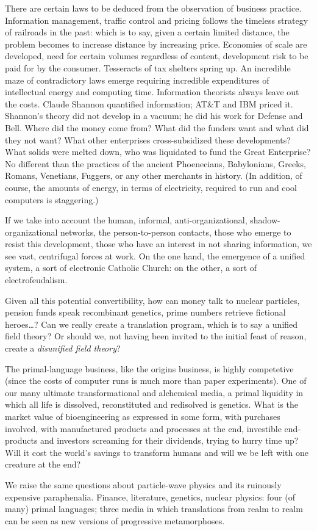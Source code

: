 There are certain laws to be deduced from the observation of business practice. Information management, traffic control and pricing follows the timeless strategy of railroads in the past: which is to say, given a certain limited distance, the problem becomes to increase distance by increasing price. Economies of scale are developed, need for certain volumes regardless of content, development risk to be paid for by the consumer. Tesseracts of tax shelters spring up. An incredible maze of contradictory laws emerge requiring incredible expenditures of intellectual energy and computing time. Information theorists always leave out the costs. Claude Shannon quantified information; AT\&T and IBM priced it. Shannon's theory did not develop in a vacuum; he did his work for Defense and Bell. Where did the money come from? What did the funders want and what did they not want? What other enterprises cross-subsidized these developments? What solids were melted down, who was liquidated to fund the Great Enterprise? No different than the practices of the ancient Phoenecians, Babylonians, Greeks, Romans, Venetians, Fuggers, or any other merchants in history. (In addition, of course, the amounts of energy, in terms of electricity, required to run and cool computers is staggering.)

If we take into account the human, informal, anti-organizational, shadow-organizational networks, the person-to-person contacts, those who emerge to resist this development, those who have an interest in not sharing information, we see vast, centrifugal forces at work. On the one hand, the emergence of a unified system, a sort of electronic Catholic Church: on the other, a sort of electrofeudalism.

Given all this potential convertibility, how can money talk to nuclear particles, pension funds speak recombinant genetics, prime numbers retrieve fictional heroes\ldots ? Can we really create a translation program, which is to say a unified field theory? Or should we, not having been invited to the initial feast of reason, create a \emph{disunified field theory}?

The primal-language business, like the origins business, is highly competetive (since the costs of computer runs is much more than paper experiments). One of our many ultimate transformational and alchemical media, a primal liquidity in which all life is dissolved, reconstituted and redisolved is genetics. What is the market value of bioengineering as expressed in some form, with purchases involved, with manufactured products and processes at the end, investible end-products and investors screaming for their dividends, trying to hurry time up? Will it cost the world's savings to transform humans and will we be left with one creature at the end?

We raise the same questions about particle-wave physics and its ruinously expensive paraphenalia. Finance, literature, genetics, nuclear physics: four (of many) primal languages; three media in which translations from realm to realm can be seen as new versions of progressive metamorphoses.
